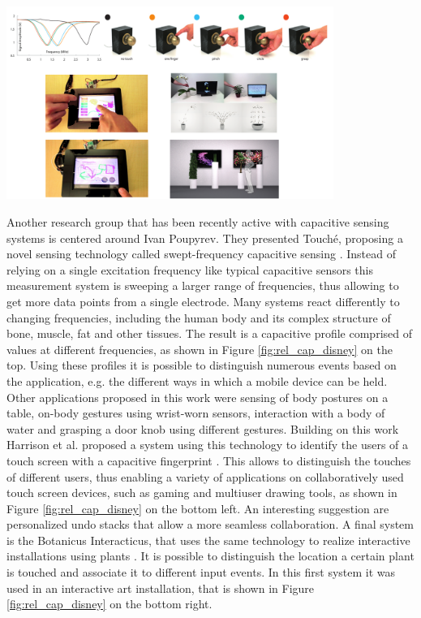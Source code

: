 \begin{minipage}{\linewidth}
\centering
\includegraphics[width=0.8\textwidth]{images/rel_cap_disney}
\label{fig:rel_cap_disney}
\end{minipage}

Another research group that has been recently active with capacitive sensing systems is centered around Ivan Poupyrev. They presented Touché, proposing a novel sensing technology called swept-frequency capacitive sensing \cite{Sato2012}. Instead of relying on a single excitation frequency like typical capacitive sensors this measurement system is sweeping a larger range of frequencies, thus allowing to get more data points from a single electrode. Many systems react differently to changing frequencies, including the human body and its complex structure of bone, muscle, fat and other tissues. The result is a capacitive profile comprised of values at different frequencies, as shown in Figure \ref{fig:rel_cap_disney} on the top. Using these profiles it is possible to distinguish numerous events based on the application, e.g. the different ways in which a mobile device can be held. Other applications proposed in this work were sensing of body postures on a table, on-body gestures using wrist-worn sensors, interaction with a body of water and grasping a door knob using different gestures. Building on this work Harrison et al. proposed a system using this technology to identify the users of a touch screen with a capacitive fingerprint \cite{harrison2012capacitive}. This allows to distinguish the touches of different users, thus enabling a variety of applications on collaboratively used touch screen devices, such as gaming and multiuser drawing tools, as shown in Figure \ref{fig:rel_cap_disney} on the bottom left. An interesting suggestion are personalized undo stacks that allow a more seamless collaboration. A final system is the Botanicus Interacticus, that uses the same technology to realize interactive installations using plants  \cite{poupyrev2012botanicus}. It is possible to distinguish the location a certain plant is touched and associate it to different input events. In this first system it was used in an interactive art installation, that is shown in Figure \ref{fig:rel_cap_disney} on the bottom right.

